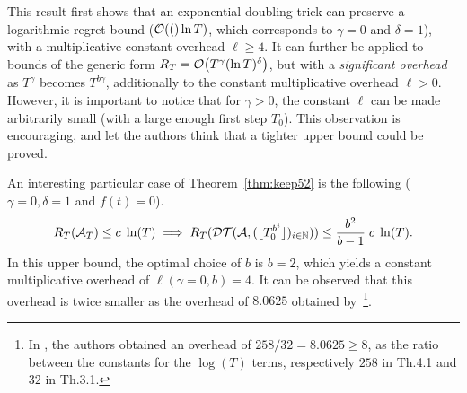 \documentclass[12pt]{colt2018} %
\begin{document}
This result first shows that an exponential doubling trick can preserve a logarithmic regret bound ($\mathop{}\mathopen{}\mathcal{O}\mathopen{}\left((\right)\ln T)$, which corresponds to $\gamma=0$ and $\delta=1$),
with a multiplicative constant overhead $\ell \geq 4$.
%
%
It can further be applied to bounds of the generic form $R_T = \mathop{}\mathopen{}\mathcal{O}\mathopen{}\left(T^{\gamma} (\ln T)^{\delta}\right)$, but with a \emph{significant overhead} as $T^{\gamma}$ becomes $T^{b\gamma}$, additionally to the constant multiplicative overhead $\ell > 0$.
However, it is important to notice that for $\gamma>0$, the constant $\ell$ can be made arbitrarily small
%
(with a large enough first step $T_0$).
This observation is encouraging,
and let the authors think that a tighter upper bound could be proved.
%


\begin{remark}\label{cor:Keep5}
%
An interesting particular case of Theorem~\ref{thm:keep52} is the following ($\gamma =0, \delta=1$ and $f(t) = 0$).
        \begin{equation}
        R_T(\mathcal{A}_T) \leq c \; \ln(T)
        \implies
        R_T(\mathcal{DT}(\mathcal{A}, (\lfloor T_0^{b^i} \rfloor)_{i\in\mathbb{N}})) \leq \frac{b^2}{b-1} \; c \; \ln(T).
    \end{equation}
    In this upper bound, the optimal choice of $b$ is $b=2$, which yields a constant multiplicative overhead of $\ell(\gamma=0, b) = 4$. It can be observed that this overhead is twice smaller as the overhead of $8.0625$ obtained by~\cite[Sec.4]{Auer10}\footnote{In \cite{Auer10}, the authors obtained an overhead of $258/32 = 8.0625 \geq 8$, as the ratio between the constants for the $\log(T)$ terms, respectively $258$ in Th.4.1 and $32$ in Th.3.1.}.
\end{remark}
\end{document}
